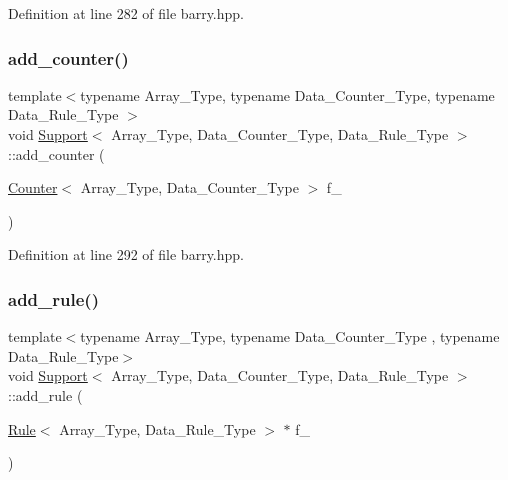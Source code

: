 Definition at line 282 of file barry.\+hpp.

\mbox{\label{classbarry_1_1_support_a00d511970c0bf833ef8bdd7580c670cc}} 
\subsubsection{\texorpdfstring{add\+\_\+counter()}{add\_counter()}\hspace{0.1cm}{\footnotesize\ttfamily [2/2]}}
{\footnotesize\ttfamily template$<$typename Array\+\_\+\+Type, typename Data\+\_\+\+Counter\+\_\+\+Type, typename Data\+\_\+\+Rule\+\_\+\+Type $>$ \\
void \hyperlink{classbarry_1_1_support}{Support}$<$ Array\+\_\+\+Type, Data\+\_\+\+Counter\+\_\+\+Type, Data\+\_\+\+Rule\+\_\+\+Type $>$\+::add\+\_\+counter (\begin{DoxyParamCaption}\item[{\hyperlink{classbarry_1_1_counter}{Counter}$<$ Array\+\_\+\+Type, Data\+\_\+\+Counter\+\_\+\+Type $>$}]{f\+\_\+ }\end{DoxyParamCaption})\hspace{0.3cm}{\ttfamily [inline]}}



Definition at line 292 of file barry.\+hpp.

\mbox{\label{classbarry_1_1_support_a3113a4586c541aa25db7b4a864b748a2}} 
\subsubsection{\texorpdfstring{add\+\_\+rule()}{add\_rule()}\hspace{0.1cm}{\footnotesize\ttfamily [1/2]}}
{\footnotesize\ttfamily template$<$typename Array\+\_\+\+Type, typename Data\+\_\+\+Counter\+\_\+\+Type , typename Data\+\_\+\+Rule\+\_\+\+Type$>$ \\
void \hyperlink{classbarry_1_1_support}{Support}$<$ Array\+\_\+\+Type, Data\+\_\+\+Counter\+\_\+\+Type, Data\+\_\+\+Rule\+\_\+\+Type $>$\+::add\+\_\+rule (\begin{DoxyParamCaption}\item[{\hyperlink{classbarry_1_1_rule}{Rule}$<$ Array\+\_\+\+Type, Data\+\_\+\+Rule\+\_\+\+Type $>$ $\ast$}]{f\+\_\+ }\end{DoxyParamCaption})\hspace{0.3cm}{\ttfamily [inline]}}



